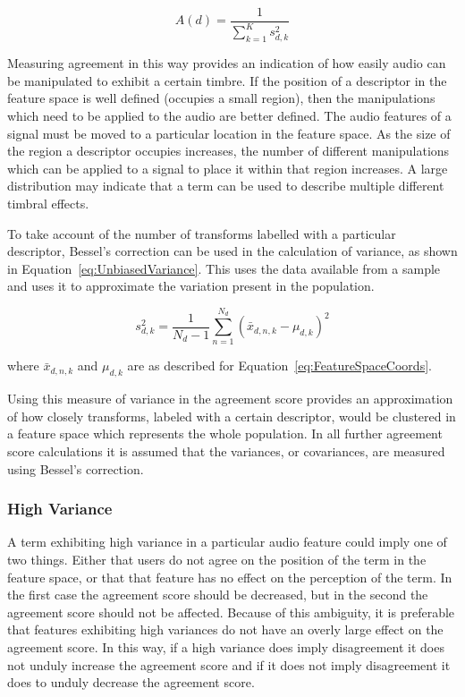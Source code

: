 			\begin{equation}
				A(d) = \frac{1}{\sum_{k = 1}^{K} s_{d,k}^{2}}
				\label{eq:ReciprocalOfSumAgreement}
			\end{equation}

			Measuring agreement in this way provides an indication of how easily audio can be manipulated to
			exhibit a certain timbre. If the position of a descriptor in the feature space is well defined
			(occupies a small region), then the manipulations which need to be applied to the audio are better
			defined. The audio features of a signal must be moved to a particular location in the feature
			space. As the size of the region a descriptor occupies increases, the number of different
			manipulations which can be applied to a signal to place it within that region increases. A large
			distribution may indicate that a term can be used to describe multiple different timbral effects.

			To take account of the number of transforms labelled with a particular descriptor, Bessel's
			correction can be used in the calculation of variance, as shown in
			Equation~\ref{eq:UnbiasedVariance}. This uses the data available from a sample and uses it to
			approximate the variation present in the population.

			\begin{equation}
				s_{d,k}^{2} = \frac{1}{N_{d} - 1} \sum_{n = 1}^{N_{d}} (\bar{x}_{d,n,k} - \mu_{d,k})^{2}
				\label{eq:UnbiasedVariance}
			\end{equation}

			where $\bar{x}_{d,n,k}$ and $\mu_{d,k}$ are as described for Equation~\ref{eq:FeatureSpaceCoords}.

			Using this measure of variance in the agreement score provides an approximation of how closely
			transforms, labeled with a certain descriptor, would be clustered in a feature space which
			represents the whole population. In all further agreement score calculations it is assumed that the
			variances, or covariances, are measured using Bessel's correction.

		\subsubsection*{High Variance}
			A term exhibiting high variance in a particular audio feature could imply one of two things.
			Either that users do not agree on the position of the term in the feature space, or that that
			feature has no effect on the perception of the term. In the first case the agreement score should
			be decreased, but in the second the agreement score should not be affected. Because of this
			ambiguity, it is preferable that features exhibiting high variances do not have an overly large
			effect on the agreement score.  In this way, if a high variance does imply disagreement it does not
			unduly increase the agreement score and if it does not imply disagreement it does to unduly
			decrease the agreement score.
			
